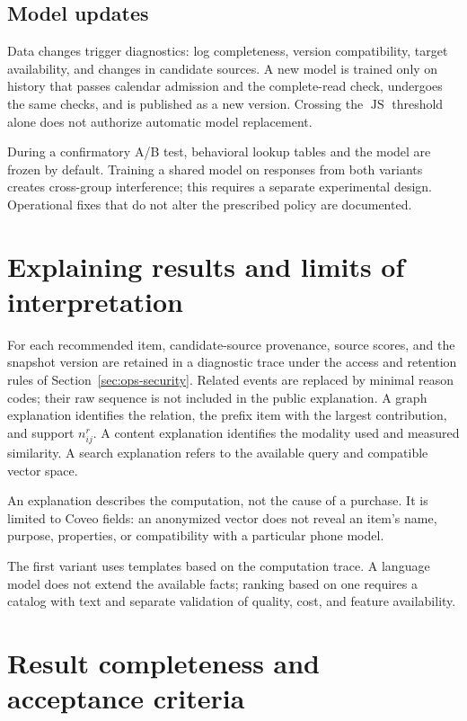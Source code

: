 \documentclass[12pt,a4paper]{article}
\theoremstyle{plainru}
\begin{document}
\subsection{Model updates}

Data changes trigger diagnostics: log completeness,
version compatibility, target availability, and changes in candidate sources.
A new model is trained only on history that passes calendar admission
and the complete-read check, undergoes the same
checks, and is published as a new version. Crossing
the \(\operatorname{JS}\) threshold alone does not authorize automatic model replacement.

During a confirmatory A/B test, behavioral lookup tables
and the model are frozen by default. Training a shared model on responses
from both variants creates cross-group interference; this requires
a separate experimental design. Operational fixes
that do not alter the prescribed policy are documented.

\section{Explaining results and limits of interpretation}\label{sec:explanation}

For each recommended item, candidate-source provenance,
source scores, and the snapshot version are retained in a diagnostic trace
under the access and retention rules of Section~\ref{sec:ops-security}.
Related events are replaced by minimal reason codes;
their raw sequence is not included in the public explanation.
A graph explanation identifies the relation, the prefix item with the largest
contribution, and support $n^r_{ij}$. A content explanation identifies the modality
used and measured similarity. A search explanation refers
to the available query and compatible vector space.

An explanation describes the computation, not the cause of a purchase. It is limited to
Coveo fields: an anonymized vector does not reveal an item's name, purpose,
properties, or compatibility with a particular phone model.

The first variant uses templates based on the computation trace.
A language model does not extend the available facts; ranking based on one
requires a catalog with text and separate validation of quality, cost,
and feature availability.

\section{Result completeness and acceptance criteria}\label{sec:acceptance}
\end{document}
